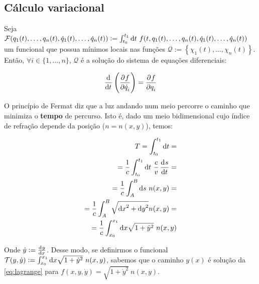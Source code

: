 \subsection{Cálculo variacional}
\label{ssec:variational_calculus}

Seja $\mathcal{F}(q_1(t), \ldots, q_n(t), \dot q_1(t), \ldots, \dot q_n(t)) :=
\int_{t_0}^{t_1} \dif t~f(t, q_1(t), \ldots, q_n(t), \dot q_1(t), \ldots, \dot
q_n(t))$  um funcional que possua mínimos locais nas funções $\mathcal{Q} :=
\left\{\chi_1(t), \ldots, \chi_n(t) \right\}$. Então, $\forall i \in \{1,
\ldots,  n\}$, $\mathcal{Q}$ é a solução do sistema de equações diferenciais:

\begin{equation}
    \label{eq:lagrange}
    \dod{}{t} \del{ \dpd{f}{\dot q_i} } = \dpd{f}{q_i}
\end{equation}

\begin{eg}
    \label{eg:fermat}
    O princípio de Fermat diz que a luz andando num meio percorre o caminho que
    minimiza o \textbf{tempo} de percurso. Isto é, dado um meio bidimensional
    cujo índice de refração depende da posição ($n = n(x,y)$), temos:

    \begin{equation}
        \begin{aligned}
        T = \int_{t_0}^{t_1} \dif t =&  \\
        = \frac{1}{c} \int_{t_0}^{t_1} \dif t~\frac{c}{v} \dod{s}{t} =& \\
        = \frac{1}{c} \int_{A}^{B} \dif s~n(x,y)  =& \\
        = \frac{1}{c} \int_{A}^{B} \sqrt{{\dif x}^2 + {\dif y}^2} n(x,y) =& \\
        = \frac{1}{c} \int_{x_0}^{x_1} \dif x \sqrt{1 + {\dot y}^2} ~ n(x,y)
        \end{aligned}
    \end{equation}

    Onde $\dot y := \tod{y}{x}$. Desse modo, se definirmos o funcional
    $\mathcal{T}(y, \dot y) := \int_{x_0}^{x_1} \dif x \sqrt{1 + {\dot y}^2} ~
    n(x,y)$,  sabemos que o caminho $y(x)$ é solução da \autoref{eq:lagrange}
    para $f(x, y, \dot y) = \sqrt{1 + {\dot y}^2}~n(x,y)$.
\end{eg}



